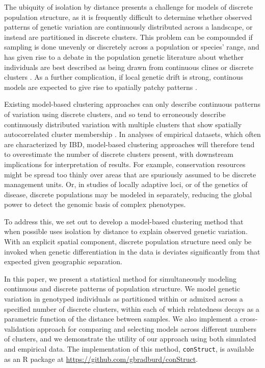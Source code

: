 \documentclass[12pt]{article}
\begin{document}
The ubiquity of isolation by distance presents a challenge for models of discrete population structure,
as it is frequently difficult to determine whether observed patterns of genetic variation are 
continuously distributed across a landscape, or instead are partitioned in discrete clusters.
This problem can be compounded if sampling is done unevenly or discretely across a population or species' range,
and has given rise to a debate in the population genetic literature about whether 
individuals are best described as being drawn from continuous clines or discrete clusters 
\citep[e.g.][]{SerrePaabo2004,rosenberg2005clines}.
As a further complication, if local genetic drift is strong,
continous models are expected to give rise to spatially patchy patterns
\citep{SLFV,bramson1989crabgrass}.

Existing model-based clustering approaches can only describe continuous patterns of variation using
discrete clusters, 
and so tend to erroneously describe continuously distributed variation with multiple clusters that 
show spatially autocorrelated cluster membership \citep{Frantz2009,meirmans2012}.
In analyses of empirical datasets, which often are characterized by IBD,
model-based clustering approaches will therefore tend to overestimate the number of discrete clusters present,
with downstream implications for interpretation of results.
For example, conservation resources might be spread too thinly over areas 
that are spuriously assumed to be discrete management units.
Or, in studies of locally adaptive loci, or of the genetics of disease,
discrete populations may be modeled in separately,
reducing the global power to detect the genomic basis of complex phenotypes.

To address this, we set out to develop
a model-based clustering method that when possible uses isolation by distance 
to explain observed genetic variation.
With an explicit spatial component, discrete population structure need only be invoked when genetic differentiation 
in the data is deviates significantly from that expected given geographic separation.

In this paper, we present a statistical method for simultaneously 
modeling continuous and discrete patterns of population structure.
We model genetic variation in genotyped individuals as 
partitioned within or admixed across a specified number of discrete clusters,
within each of which relatedness decays as a parametric function of the distance between samples.
We also implement a cross-validation approach for comparing and selecting models across different numbers of clusters,
and we demonstrate the utility of our approach using both simulated and empirical data.
The implementation of this method, \texttt{conStruct}, is available as an R package at 
\href{https://github.com/gbradburd/conStruct}{https://github.com/gbradburd/conStruct}.
\end{document}
